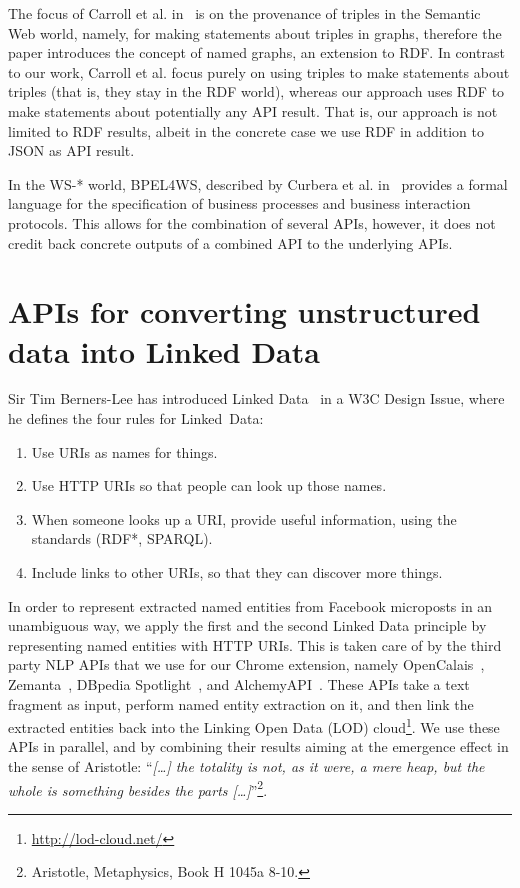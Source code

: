 \documentclass[conference]{IEEEtran}
\begin{document}
The focus of Carroll et al. in~\cite{carroll2005} is on the provenance of triples in the Semantic Web world, namely, for making statements about triples in graphs, therefore the paper introduces the concept of named graphs, an extension to RDF. In contrast to our work, Carroll et al. focus purely on using triples to make statements about triples (that is, they stay in the RDF world), whereas our approach uses RDF to make statements about potentially any API result. That is, our approach is not limited to RDF results, albeit in the concrete case we use RDF in addition to JSON as API result.
 
In the WS-* world, BPEL4WS, described by Curbera et al. in~\cite{Curbera:2003:NSW:944217.944234} provides a formal language for the specification of business processes and business interaction protocols. This allows for the combination of several APIs, however, it does not credit back concrete outputs of a combined API to the underlying APIs.

\section{APIs for converting unstructured data into Linked Data}    \label{sec:services}
Sir Tim Berners-Lee has introduced Linked Data~\cite{TimBL:LinkedData} in a W3C Design Issue, where he defines the four rules for Linked~Data:
\begin{enumerate}
\item Use URIs as names for things.
\item Use HTTP URIs so that people can look up those names.
\item When someone looks up a URI, provide useful information, using the standards (RDF*, SPARQL).
\item Include links to other URIs, so that they can discover more things.
\end{enumerate}
In order to represent extracted named entities from Facebook microposts in an unambiguous way, we apply the first and the second Linked Data principle by representing named entities with HTTP URIs. This is taken care of by the third party NLP APIs that we use for our Chrome extension, namely OpenCalais~\cite{OpenCalais}, Zemanta~\cite{Zemanta}, DBpedia Spotlight~\cite{Spotlight}, and AlchemyAPI~\cite{AlchemyApi}. These APIs take a text fragment as input, perform named entity extraction on it, and then link the extracted entities back into the Linking Open Data (LOD) cloud\footnote{\url{http://lod-cloud.net/}}. We use these APIs in parallel, and by combining their results aiming at the emergence effect in the sense of Aristotle: ``\emph{[\ldots] the totality is not, as it were, a mere heap, but the whole is something besides the parts [\ldots]}''\footnote{Aristotle, Metaphysics, Book H 1045a 8-10.}. 
\end{document}
